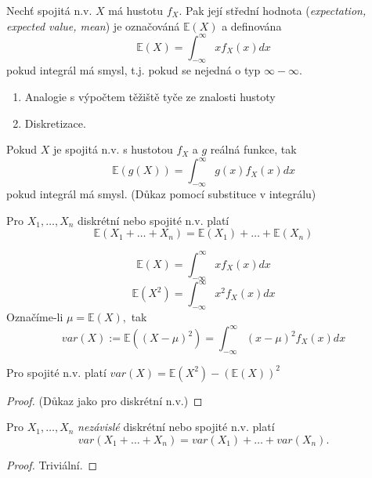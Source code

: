 \documentclass[../main.tex]{subfiles}
\begin{document}
\begin{definition}
    Nechť spojitá n.v. $X$ má hustotu $f_X$. Pak její střední hodnota (\textit{expectation, expected value, mean})
    je označováná $\mathbb{E}(X)$ a definována
    \[\mathbb{E}(X) = \int^\infty_{-\infty} xf_X(x)dx\]
    pokud integrál má smysl, t.j. pokud se nejedná o typ $\infty - \infty$.
    \begin{enumerate}
        \item Analogie s výpočtem těžiště tyče ze znalosti hustoty
        \item Diskretizace.
    \end{enumerate}
\end{definition}

\begin{theorem}[LOTUS]
    Pokud $X$ je spojitá n.v. s hustotou $f_X$ a $g$ reálná funkce, tak
    \[\mathbb{E}(g(X)) = \int^\infty_{-\infty}g(x) f_X(x)dx\]
    pokud integrál má smysl. (Důkaz pomocí substituce v integrálu)
\end{theorem}

\begin{theorem}
    Pro $X_1,\dots,X_n$ diskrétní nebo spojité n.v. platí
    \[\mathbb{E}(X_1 + \dots + X_n) = \mathbb{E}(X_1) + \dots + \mathbb{E}(X_n)\]
\end{theorem}

\begin{definition}
    \[\mathbb{E}(X) = \int^\infty_{-\infty} xf_X(x)dx\]
    \[\mathbb{E}(X^2) = \int^\infty_{-\infty} x^2f_X(x)dx\]
    Označíme-li $\mu = \mathbb{E}(X),$ tak
    \[var(X) := \mathbb{E}((X-\mu)^2) = \int^\infty_{-\infty} (x-\mu)^2 f_X(x)dx\]
\end{definition}

\begin{theorem}
    Pro spojité n.v. platí $var(X) = \mathbb{E}(X^2) - (\mathbb{E}(X))^2$\\
\end{theorem}
\begin{proof}
    (Důkaz jako pro diskrétní n.v.)
\end{proof}

\begin{theorem}
    Pro $X_1,\dots,X_n$ \textit{nezávislé} diskrétní nebo spojité n.v. platí
    \[var(X_1 + \dots + X_n) = var(X_1) + \dots + var(X_n).\]
\end{theorem}
\begin{proof}
    Triviální.
\end{proof}
\end{document}

